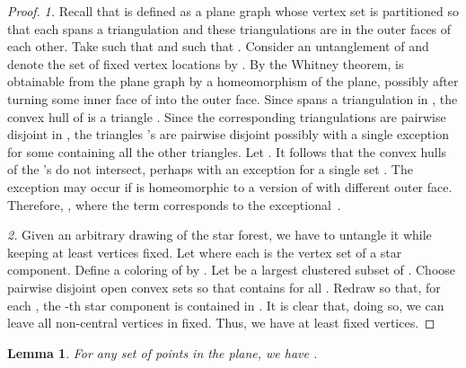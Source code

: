 \documentclass[reqno,12pt]{amsart}
\newtheorem{lemma}[theorem]{Lemma}
\begin{document}
\begin{proof}
{\sl 1.}
Recall that  is defined as a plane graph whose vertex set
 is partitioned so that each  spans
a triangulation and these  triangulations are in the outer faces of each other.
Take  such that  and
 such that .
Consider an untanglement  of  and denote the set
of fixed vertex locations by . 
By the Whitney theorem,  is obtainable from the plane graph 
by a homeomorphism of the plane, possibly after turning some inner face of 
into the outer face.
Since  spans a triangulation in , the convex hull of 
is a triangle . Since the corresponding triangulations are pairwise
disjoint in , the triangles 's are pairwise disjoint possibly with
a single exception for some  containing all the other triangles.
Let . It follows that the convex hulls of the
's do not intersect, perhaps with an exception for a single
set . The exception may occur if  is homeomorphic to a version 
of  with different outer face.
Therefore, , where the term  corresponds to the exceptional~.

{\sl 2.}
Given an arbitrary drawing  of the star forest, 
we have to untangle it while keeping at least  vertices
fixed. Let  where each  is the vertex set
of a star component. Define a coloring  of  by .
Let  be a largest clustered subset of . 
Choose pairwise disjoint open convex sets  so that  
contains  for all . Redraw  so that, for each , 
the -th star component is contained in . It is
clear that, doing so, we can leave all non-central vertices in  fixed.
Thus, we have at least  fixed vertices.
\end{proof}

\begin{lemma}\label{lem:CX}
For any set  of  points in the plane, we have .
\end{lemma}
\end{document}
